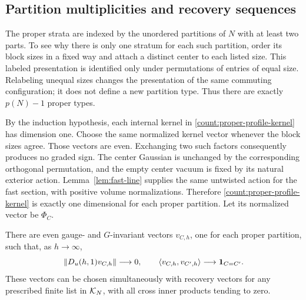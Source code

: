 \subsection{Partition multiplicities and recovery sequences}

The proper strata are indexed by the unordered partitions of \(N\) with
at least two parts. To see why there is only one stratum for each such
partition, order its block sizes in a fixed way and attach a distinct
center to each listed size. This labeled presentation is identified
only under permutations of entries of equal size. Relabeling unequal
sizes changes the presentation of the same commuting configuration; it
does not define a new partition type. Thus there are exactly
\(p(N)-1\) proper types.

By the induction hypothesis, each internal kernel in
\eqref{count:proper-profile-kernel} has dimension one. Choose the same
normalized kernel vector whenever the block sizes agree. Those vectors
are even. Exchanging two such factors consequently produces no graded
sign. The center Gaussian is unchanged by the corresponding orthogonal
permutation, and the empty center vacuum is fixed by its natural
exterior action. Lemma~\ref{lem:fast-line} supplies the same untwisted
action for the fast section, with positive volume normalizations.
Therefore \eqref{count:proper-profile-kernel} is exactly one dimensional
for each proper partition. Let its normalized vector be \(\Phi_C\).

\begin{lemma}
\label{count:proper-recovery}
There are even gauge- and \(G\)-invariant vectors \(v_{C,h}\), one for
each proper partition, such that, as \(h\to\infty\),
\begin{equation}\label{count:proper-recovery-estimates}
 \left\lVert D_u(h,1)v_{C,h}\right\rVert\longrightarrow0,
 \qquad
 \left\langle v_{C,h},v_{C',h}\right\rangle\longrightarrow\mathbf1_{C=C'}.
\end{equation}
These vectors can be chosen simultaneously with recovery vectors for
any prescribed finite list in \(\mathcal K_N\), with all cross inner products
tending to zero.
\end{lemma}

